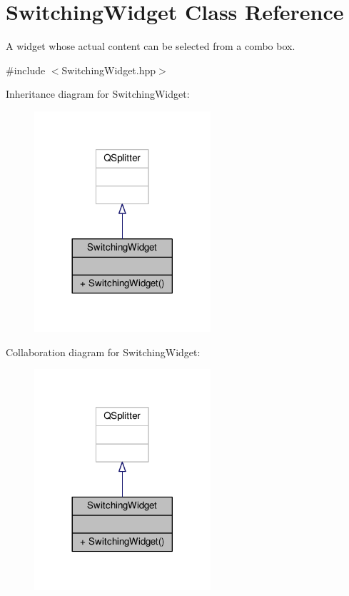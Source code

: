 \hypertarget{class_switching_widget}{}\section{Switching\+Widget Class Reference}
\label{class_switching_widget}


A widget whose actual content can be selected from a combo box.  




{\ttfamily \#include $<$Switching\+Widget.\+hpp$>$}



Inheritance diagram for Switching\+Widget\+:
\nopagebreak
\begin{figure}[H]
\begin{center}
\leavevmode
\includegraphics[width=185pt]{class_switching_widget__inherit__graph}
\end{center}
\end{figure}


Collaboration diagram for Switching\+Widget\+:
\nopagebreak
\begin{figure}[H]
\begin{center}
\leavevmode
\includegraphics[width=185pt]{class_switching_widget__coll__graph}
\end{center}
\end{figure}
